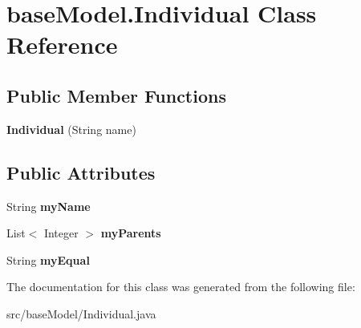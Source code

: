 \hypertarget{classbase_model_1_1_individual}{}\section{base\+Model.\+Individual Class Reference}
\label{classbase_model_1_1_individual}
\subsection*{Public Member Functions}
\begin{DoxyCompactItemize}
\item 
\hypertarget{classbase_model_1_1_individual_aa2643434808ffba9bef0b69f7f5efe47}{}{\bfseries Individual} (String name)\label{classbase_model_1_1_individual_aa2643434808ffba9bef0b69f7f5efe47}

\end{DoxyCompactItemize}
\subsection*{Public Attributes}
\begin{DoxyCompactItemize}
\item 
\hypertarget{classbase_model_1_1_individual_afc76a9a0ab30ef0cf4f23e4f9f244de3}{}String {\bfseries my\+Name}\label{classbase_model_1_1_individual_afc76a9a0ab30ef0cf4f23e4f9f244de3}

\item 
\hypertarget{classbase_model_1_1_individual_a0d023d705af281f210985389fd6fd9ce}{}List$<$ Integer $>$ {\bfseries my\+Parents}\label{classbase_model_1_1_individual_a0d023d705af281f210985389fd6fd9ce}

\item 
\hypertarget{classbase_model_1_1_individual_ab18a2cd12ea2693334753588f93fce71}{}String {\bfseries my\+Equal}\label{classbase_model_1_1_individual_ab18a2cd12ea2693334753588f93fce71}

\end{DoxyCompactItemize}


The documentation for this class was generated from the following file\+:\begin{DoxyCompactItemize}
\item 
src/base\+Model/Individual.\+java\end{DoxyCompactItemize}
